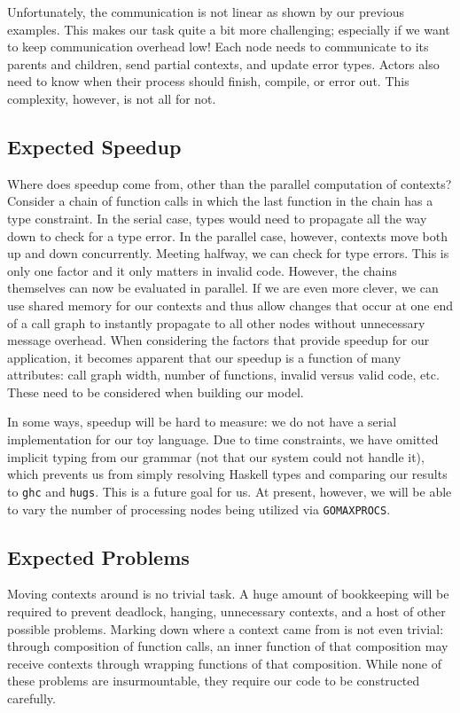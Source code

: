 \documentclass{acm_proc_article-sp}
\begin{document}
Unfortunately, the communication is not linear as shown by our
previous examples. This makes our task quite a bit more challenging;
especially if we want to keep communication overhead low! Each node
needs to communicate to its parents and children, send partial
contexts, and update error types. Actors also need to know when their
process should finish, compile, or error out. This complexity,
however, is not all for not.

\subsection{Expected Speedup}

Where does speedup come from, other than the parallel computation of
contexts? Consider a chain of function calls in which the last
function in the chain has a type constraint. In the serial case, types
would need to propagate all the way down to check for a type error. In
the parallel case, however, contexts move both up and down
concurrently. Meeting halfway, we can check for type errors. This
is only one factor and it only matters in invalid code. However, the
chains themselves can now be evaluated in parallel. If we are even
more clever, we can use shared memory for our contexts and thus allow
changes that occur at one end of a call graph to instantly propagate
to all other nodes without unnecessary message overhead. When
considering the factors that provide speedup for our application, it
becomes apparent that our speedup is a function of many attributes:
call graph width, number of functions, invalid versus valid code, etc.
These need to be considered when building our model.

In some ways, speedup will be hard to measure: we do not have a serial
implementation for our toy language. Due to time constraints, we
have omitted implicit typing from our grammar (not that our system
could not handle it), which prevents us from simply resolving Haskell
types and comparing our results to \texttt{ghc} and
\texttt{hugs}. This is a future goal for us. At present, however,
we will be able to vary the number of processing nodes being
utilized via \texttt{GOMAXPROCS}.

\subsection{Expected Problems}

Moving contexts around is no trivial task. A huge amount of
bookkeeping will be required to prevent deadlock, hanging, unnecessary
contexts, and a host of other possible problems. Marking down where a
context came from is not even trivial: through composition of
function calls, an inner function of that composition may receive
contexts through wrapping functions of that composition. While none of
these problems are insurmountable, they require our code to be
constructed carefully.
\end{document}
